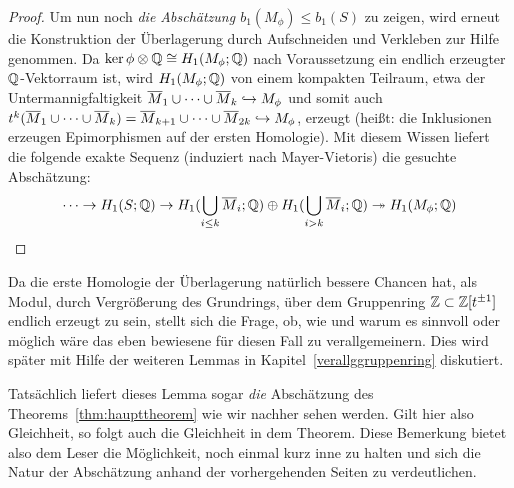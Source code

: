 \begin{proof}
	  Um nun noch\emph{ die Abschätzung $b_1(M_\phi) \leq b_1(S)$ }zu zeigen, wird erneut die Konstruktion der Überlagerung durch Aufschneiden und Verkleben zur Hilfe genommen. Da $\ker\phi \otimes \mathbb{Q} \cong H_1(M_\phi;\mathbb{Q})$ nach Voraussetzung ein endlich erzeugter $\mathbb{Q}$-Vektorraum ist, wird $H_1(M_\phi;\mathbb{Q})$ von einem kompakten Teilraum, etwa der Untermannigfaltigkeit $\overline M_1 \cup \cdots \cup \overline M_k \hookrightarrow M_\phi$ und somit auch $t^k(\overline M_1 \cup \cdots \cup \overline M_k )  = \overline M_{k+1} \cup \cdots \cup \overline M_{2k}\hookrightarrow M_\phi$, erzeugt (heißt: die Inklusionen erzeugen Epimorphismen auf der ersten Homologie). Mit diesem Wissen liefert die folgende exakte Sequenz (induziert nach Mayer-Vietoris) die gesuchte Abschätzung:
	  \[
	  	\cdots \to H_1(S;\mathbb{Q}) \to H_1(\bigcup_{i\leq k}\overline M_i;\mathbb{Q}) \oplus H_1(\bigcup_{i>k} \overline M_i;\mathbb{Q}) \twoheadrightarrow H_1(M_\phi;\mathbb{Q})
	  \]
\end{proof}

\begin{bem}
Da die erste Homologie der Überlagerung natürlich bessere Chancen hat, als Modul, durch Vergrößerung des Grundrings, über dem Gruppenring $\mathbb{Z}\subset \mathbb{Z}[t^{\pm 1}]$ endlich erzeugt zu sein, stellt sich die Frage, ob, wie und warum es sinnvoll oder möglich wäre das eben bewiesene für diesen Fall zu verallgemeinern. Dies wird später mit Hilfe der weiteren Lemmas in Kapitel~\ref{verallggruppenring} diskutiert. 
\end{bem}
\begin{bem}
	Tatsächlich liefert dieses Lemma sogar \emph{die} Abschätzung des Theorems~\ref{thm:haupttheorem} wie wir nachher sehen werden. Gilt hier also Gleichheit, so folgt auch die Gleichheit in dem Theorem. Diese Bemerkung bietet also dem Leser die Möglichkeit, noch einmal kurz inne zu halten und sich die Natur der Abschätzung anhand der vorhergehenden Seiten zu verdeutlichen.
\end{bem}
